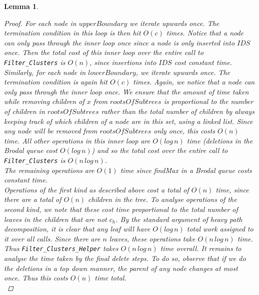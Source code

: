 \documentclass{article}
\newtheorem{filterclustersruntime}[incompatibility]{Lemma}
\begin{document}
\begin{filterclustersruntime}
\begin{proof}
            For each node in $upperBoundary$ we iterate upwards once. The termination condition in this loop is then hit $O(c)$ times. Notice that a node can only pass through the inner loop once since a node is only inserted into $IDS$ once. Then the total cost of this inner loop over the entire call to \texttt{Filter\_Clusters} is $O(n)$, since insertions into $IDS$ cost constant time.\\

            Similarly, for each node in $lowerBoundary$, we iterate upwards once. The termination condition is again hit $O(c)$ times. Again, we notice that a node can only pass through the inner loop once. We ensure that the amount of time taken while removing children of $x$ from $rootsOfSubtrees$ is proportional to the number of children in $rootsOfSubtrees$ rather than the total number of children by always keeping track of which children of a node are in this set, using a linked list. Since any node will be removed from $rootsOfSubtrees$ only once, this costs $O(n)$ time. All other operations in this inner loop are $O(log\,n)$ time (deletions in the Brodal queue cost $O(log\,n)$) and so the total cost over the entire call to \texttt{Filter\_Clusters} is $O(n\,log\,n)$.\\

            The remaining operations are $O(1)$ time since findMax in a Brodal queue costs constant time.\\

            Operations of the first kind as described above cost a total of $O(n)$ time, since there are a total of $O(n)$ children in the tree. To analyse operations of the second kind, we note that these cost time proportional to the total number of leaves in the children that are not $c_h$. By the standard argument of heavy path decomposition, it is clear that any leaf will have $O(log\,n)$ total work assigned to it over all calls. Since there are $n$ leaves, these operations take $O(n\,log\,n)$ time.\\

            Thus \texttt{Filter\_Clusters\_Helper} takes $O(n\,log\,n)$ time overall. It remains to analyse the time taken by the final \textit{delete} steps. To do so, observe that if we do the deletions in a top down manner, the parent of any node changes at most once. Thus this costs $O(n)$ time total.\\
        \end{proof}
    \end{filterclustersruntime}
\end{document}
